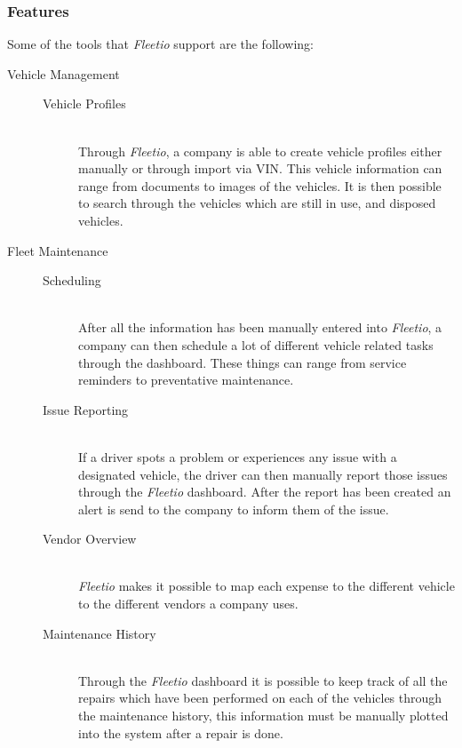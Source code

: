 \subsubsection{Features}\label{ssub:features}
Some of the tools that \textit{Fleetio} support are the following:
\begin{description}
    \item[Vehicle Management] \hfill
    \begin{description}
        \item[Vehicle Profiles] \hfill \\
        Through \textit{Fleetio}, a company is able to create vehicle profiles either manually or through import via VIN. This vehicle information can range from documents to images of the vehicles.
        It is then possible to search through the vehicles which are still in use, and disposed vehicles.
    \end{description}

    \item[Fleet Maintenance] \hfill
    \begin{description}
        \item[Scheduling] \hfill \\
        After all the information has been manually entered into \textit{Fleetio}, a company can then schedule a lot of different vehicle related tasks through the dashboard.
        These things can range from service reminders to preventative maintenance.
        \item[Issue Reporting] \hfill \\
        If a driver spots a problem or experiences any issue with a designated vehicle, the driver can then manually report those issues through the \textit{Fleetio} dashboard.
        After the report has been created an alert is send to the company to inform them of the issue.
        \item[Vendor Overview] \hfill \\
        \textit{Fleetio} makes it possible to map each expense to the different vehicle to the different vendors a company uses.
        \item[Maintenance History] \hfill \\
        Through the \textit{Fleetio} dashboard it is possible to keep track of all the repairs which have been performed on each of the vehicles through the maintenance history, this information must be manually plotted into the system after a repair is done.
    \end{description}


\end{description}
